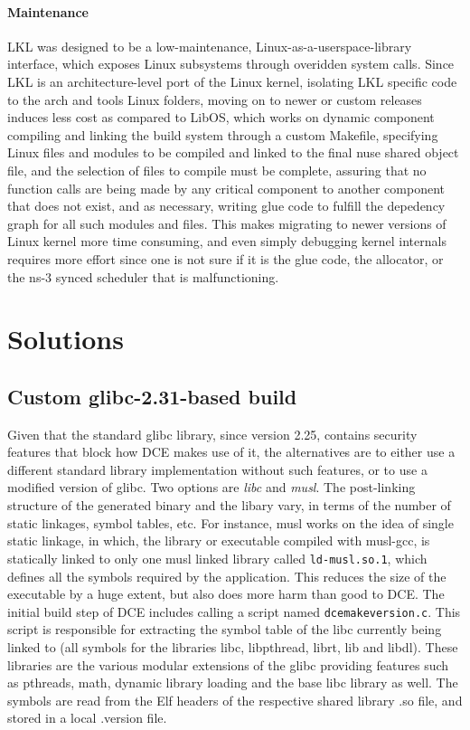 \documentclass{sig-alternate}
\begin{document}
\paragraph{Maintenance}
LKL was designed to be a low-maintenance, Linux-as-a-userspace-library interface, which exposes Linux subsystems through overidden system calls. 
Since LKL is an architecture-level port of the Linux kernel, isolating LKL specific code to the arch and tools Linux folders, moving on to 
newer or custom releases induces less cost as compared to LibOS, which works on dynamic component compiling and linking the build system through a
custom Makefile, specifying Linux files and modules to be compiled and linked to the final nuse shared object file, and the selection of files to compile must be complete, assuring that no function calls are being made by any critical component to another component that does not 
exist, and as necessary, writing glue code to fulfill the depedency graph for all such modules and files. This makes migrating to newer versions of Linux kernel more time consuming, and 
even simply debugging kernel internals requires more effort since one is not sure if it is the glue code,
the allocator, or the ns-3 synced scheduler that is malfunctioning.

\section{Solutions}
\label{section:design}

\subsection{Custom glibc-2.31-based build}
Given that the standard glibc library, since version 2.25, contains security features that block how DCE makes use of it, the alternatives are to either use a different standard library implementation without such features, or to use a modified version of glibc.  Two options are \textit{libc} and \textit{musl}.
The post-linking structure
of the generated binary and the libary vary, in terms of the number of static linkages, symbol tables, etc. For instance, musl works on the idea of
single static linkage, in which, the library or executable compiled with musl-gcc, is statically linked to only one musl linked library called 
\texttt{ld-musl.so.1}, which defines all the symbols required by the application. This reduces the size of the executable by a huge extent, but 
also does more harm than good to DCE. The initial build step of DCE includes calling a script named \texttt{dcemakeversion.c}. This script is responsible 
for extracting the symbol table of the libc currently being linked to (all symbols for the libraries libc, libpthread, librt, lib and libdl). These 
libraries are the various modular extensions of the glibc providing features such as pthreads, math, dynamic library loading and the base libc 
library as well. The symbols are read from the Elf headers of the respective shared library .so file, and stored in a local .version file.
 
\end{document}
